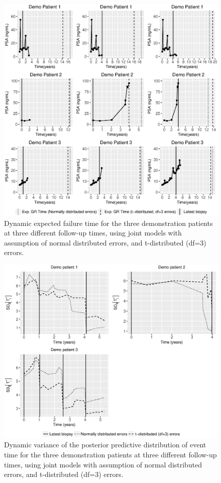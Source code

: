\begin{enumerate}
	\begin{figure}[!htb]
	\centerline{\includegraphics[width=\columnwidth]{images/model_fit/demo_expfail_norm_t3.eps}}
	\caption{Dynamic expected failure time for the three demonstration patients at three different follow-up times, using joint models with assumption of normal distributed errors, and t-distributed (df=3) errors.}
	\label{fig : demo_expfail_norm_t3}
	\end{figure}

	\begin{figure}[!htb]
	\centerline{\includegraphics[width=\columnwidth]{images/model_fit/variance_demo_patients_norm_t3.eps}}
	\caption{Dynamic variance of the posterior predictive distribution of event time for the three demonstration patients at three different follow-up times, using joint models with assumption of normal distributed errors, and t-distributed (df=3) errors.}
	\label{fig : variance_demo_patients_norm_t3}
	\end{figure}


\end{enumerate}
